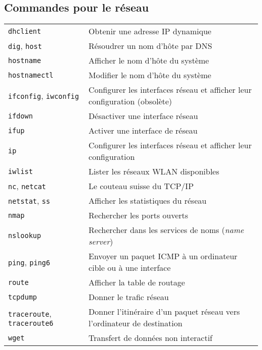 \documentclass[10pt,a4paper]{article}
\begin{document}
\begin{multicols}{2}

\section{Commandes pour le réseau}
\begin{tabular}{ p{2.5cm} p{8.5cm} }
  \hline
  \texttt{dhclient} & Obtenir une adresse IP dynamique \\
  \texttt{dig}, \texttt{host} & Résoudrer un nom d'hôte par DNS \\
  \texttt{hostname} & Afficher le nom d'hôte du système \\
  \texttt{hostnamectl} & Modifier le nom d'hôte du système \\
  \texttt{ifconfig}, \texttt{iwconfig} & Configurer les interfaces réseau et afficher leur confi\-guration (obsolète)\\
  \texttt{ifdown} & Désactiver une interface réseau \\
  \texttt{ifup} & Activer une interface de réseau\\
  \texttt{ip} & Configurer les interfaces réseau et afficher leur confi\-guration\\
  \texttt{iwlist} & Lister les réseaux WLAN disponibles\\
  \texttt{nc}, \texttt{netcat} & Le couteau suisse du TCP/IP \\
  \texttt{netstat}, \texttt{ss} & Afficher les statistiques du réseau \\
  \texttt{nmap} & Rechercher les ports ouverts \\
  \texttt{nslookup} & Rechercher dans les services de noms (\textit{name server}) \\
  \texttt{ping}, \texttt{ping6} & Envoyer un paquet ICMP à un ordinateur cible ou à une interface\\
  \texttt{route} & Afficher la table de routage \\
  \texttt{tcpdump} & Donner le trafic réseau \\
  \texttt{traceroute}, \texttt{traceroute6} & Donner l'itinéraire d'un paquet réseau vers \newline l'ordinateur de destination \\
  \texttt{wget} & Transfert de données non interactif \\
  \hline
\end{tabular}

\hfill


\end{multicols}
\end{document}
